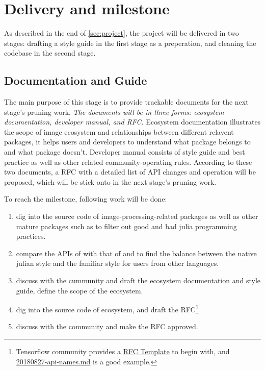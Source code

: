 
\section{Delivery and milestone}\label{sec:delivery}


As described in the end of \cref{sec:project}, the project will be delivered in two stages: drafting a style guide in the first stage as a preperation, and cleaning the codebase in the second stage.

\subsection{Documentation and Guide}\label{subsec:documentation}

The main purpose of this stage is to provide trackable documents for the next stage's pruning work. \emph{The documents will be in three forms: ecosystem documentation, developer manual, and RFC}. Ecosystem documentation illustrates the scope of image ecosystem and relationships between different relavent packages, it helps users and developers to understand what package belongs to \images{} and what package doesn't. Developer manual consists of style guide and best practice as well as other related community-operating rules. According to these two documents, a RFC with a detailed list of API changes and operation will be proposed, which will be stick onto in the next stage's pruning work.

To reach the milestone, following work will be done:

\begin{enumerate}
    \item dig into the source code of image-processing-related \langjulia packages as well as other mature \langjulia{} packages such as \repojump to filter out good and bad julia programming practices.
    \item compare the APIs of \images{} with that of \reposcikitimage{} and \matlabimageprocessing{} to find the balance between the native julian style and the familiar style for users from other languages.
    \item discuss with the cummunity and draft the ecosystem documentation and style guide, define the scope of the ecosystem.
    \item dig into the source code of \images{} ecosystem, and draft the RFC\footnote{Tensorflow community provides a \href{https://github.com/tensorflow/community/blob/master/rfcs/yyyymmdd-rfc-template.md}{RFC Template} to begin with, and \href{https://github.com/tensorflow/community/blob/master/rfcs/20180827-api-names.md}{20180827-api-names.md} is a good example.}
    \item discuss with the community and make the RFC approved.
\end{enumerate}

